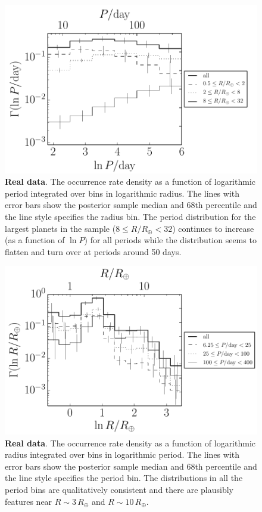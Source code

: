 \documentclass[12pt,preprint]{aastex}
\newcommand{\figlabel}[1]{\label{fig:#1}}
\newcommand{\period}{\ensuremath{P}}
\begin{document}
\begin{figure}[p]
\begin{center}
\includegraphics{figures/results/period.pdf}
\end{center}
\caption{%
{\bf Real data}.
The occurrence rate density as a function of logarithmic period integrated
over bins in logarithmic radius.
The lines with error bars show the posterior sample median and 68th
percentile and the line style specifies the radius bin.
The period distribution for the largest planets in the sample
($8 \le R/R_\oplus < 32$) continues to increase (as a function of
$\ln\period$) for all periods while the distribution seems to flatten and
turn over at periods around 50 days.
\figlabel{period}}
\end{figure}

\begin{figure}[p]
\begin{center}
\includegraphics{figures/results/radius.pdf}
\end{center}
\caption{%
{\bf Real data}.
The occurrence rate density as a function of logarithmic radius integrated
over bins in logarithmic period.
The lines with error bars show the posterior sample median and 68th
percentile and the line style specifies the period bin.
The distributions in all the period bins are qualitatively consistent and
there are plausibly features near $R\sim3\,R_\oplus$ and $R\sim10\,R_\oplus$.
\figlabel{radius}}
\end{figure}
\end{document}
